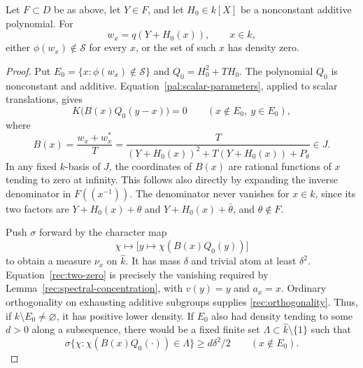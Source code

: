 \begin{lemma}\label{rec:two-density}
Let \(F\subset D\) be as above, let \(Y\in F\), and let
\(H_0\in k[X]\) be a nonconstant additive polynomial.  For
\[
 w_x=q(Y+H_0(x)),\qquad x\in k,
\]
either \(\phi(w_x)\notin\mathcal S\) for every \(x\), or the set of
such \(x\) has density zero.
\end{lemma}

\begin{proof}
Put \(E_0=\{x:\phi(w_x)\notin\mathcal S\}\) and
\(Q_0=H_0^2+TH_0\).  The polynomial \(Q_0\) is nonconstant and
additive.  Equation~\ref{pal:scalar-parameters}, applied to scalar
translations, gives
\begin{equation}\label{rec:two-zero}
 K\bigl(B(x)Q_0(y-x)\bigr)=0\qquad(x\notin E_0,\ y\in E_0),
\end{equation}
where
\begin{equation}\label{rec:two-coefficient}
 B(x)=\frac{w_x+w_x^*}{T}
     =\frac{T}{(Y+H_0(x))^2+T(Y+H_0(x))+P_\theta}\in J.
\end{equation}
In any fixed \(k\)-basis of \(J\), the coordinates of \(B(x)\) are
rational functions of \(x\) tending to zero at infinity.  This follows
also directly by expanding the inverse denominator in
\(F((x^{-1}))\).  The denominator never vanishes for \(x\in k\),
since its two factors are \(Y+H_0(x)+\theta\) and
\(Y+H_0(x)+\bar\theta\), and \(\theta\notin F\).

Push \(\sigma\) forward by the character map
\[
 \chi\longmapsto
 \bigl[y\longmapsto\chi(B(x)Q_0(y))\bigr]
\]
to obtain a measure \(\nu_x\) on \(\widehat k\).  It has mass
\(\delta\) and trivial atom at least \(\delta^2\).
Equation~\eqref{rec:two-zero} is precisely the vanishing required by
Lemma~\ref{rec:spectral-concentration}, with \(v(y)=y\) and \(a_x=x\).
Ordinary orthogonality on exhausting additive subgroups supplies
\eqref{rec:orthogonality}.  Thus, if \(k\setminus E_0\ne\varnothing\),
it has positive lower density.  If \(E_0\) also had density tending to
some \(d>0\) along a subsequence, there would be a fixed finite set
\(\Lambda\subset\widehat k\setminus\{1\}\) such that
\begin{equation}\label{rec:two-spectral-mass}
 \sigma\{\chi:\chi(B(x)Q_0(\cdot))\in\Lambda\}
       \geq d\delta^2/2\qquad(x\notin E_0).
\end{equation}


\end{proof}

